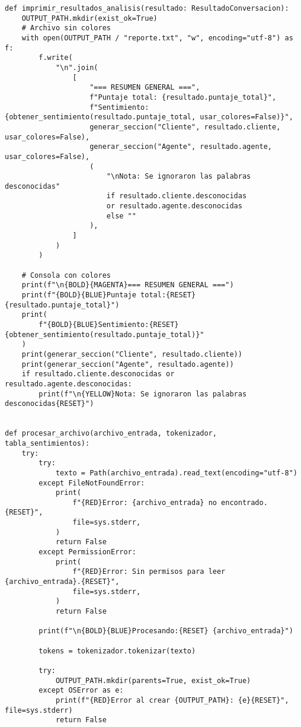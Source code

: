 \begin{lstlisting}
def imprimir_resultados_analisis(resultado: ResultadoConversacion):
    OUTPUT_PATH.mkdir(exist_ok=True)
    # Archivo sin colores
    with open(OUTPUT_PATH / "reporte.txt", "w", encoding="utf-8") as f:
        f.write(
            "\n".join(
                [
                    "=== RESUMEN GENERAL ===",
                    f"Puntaje total: {resultado.puntaje_total}",
                    f"Sentimiento: {obtener_sentimiento(resultado.puntaje_total, usar_colores=False)}",
                    generar_seccion("Cliente", resultado.cliente, usar_colores=False),
                    generar_seccion("Agente", resultado.agente, usar_colores=False),
                    (
                        "\nNota: Se ignoraron las palabras desconocidas"
                        if resultado.cliente.desconocidas
                        or resultado.agente.desconocidas
                        else ""
                    ),
                ]
            )
        )

    # Consola con colores
    print(f"\n{BOLD}{MAGENTA}=== RESUMEN GENERAL ===")
    print(f"{BOLD}{BLUE}Puntaje total:{RESET} {resultado.puntaje_total}")
    print(
        f"{BOLD}{BLUE}Sentimiento:{RESET} {obtener_sentimiento(resultado.puntaje_total)}"
    )
    print(generar_seccion("Cliente", resultado.cliente))
    print(generar_seccion("Agente", resultado.agente))
    if resultado.cliente.desconocidas or resultado.agente.desconocidas:
        print(f"\n{YELLOW}Nota: Se ignoraron las palabras desconocidas{RESET}")


def procesar_archivo(archivo_entrada, tokenizador, tabla_sentimientos):
    try:
        try:
            texto = Path(archivo_entrada).read_text(encoding="utf-8")
        except FileNotFoundError:
            print(
                f"{RED}Error: {archivo_entrada} no encontrado.{RESET}",
                file=sys.stderr,
            )
            return False
        except PermissionError:
            print(
                f"{RED}Error: Sin permisos para leer {archivo_entrada}.{RESET}",
                file=sys.stderr,
            )
            return False

        print(f"\n{BOLD}{BLUE}Procesando:{RESET} {archivo_entrada}")

        tokens = tokenizador.tokenizar(texto)

        try:
            OUTPUT_PATH.mkdir(parents=True, exist_ok=True)
        except OSError as e:
            print(f"{RED}Error al crear {OUTPUT_PATH}: {e}{RESET}", file=sys.stderr)
            return False


\end{lstlisting}
